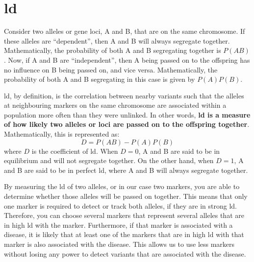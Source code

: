 \section{\glsdesc{ld}}
\label{sec:ld}

Consider two alleles or gene loci, A and B, that are on the same chromosome.
If these alleles are ``dependent'', then A and B will always segregate together.
Mathematically, the probability of both A and B segregating together is $P(AB)$.
Now, if A and B are ``independent'', then A being passed on to the offspring has no influence on B being passed on, and vice versa.
Mathematically, the probability of both A and B segregating in this case is given by $P(A)P(B)$.

\Gls{ld}, by definition, is the correlation between nearby variants such that the alleles at neighbouring markers on the same chromosome are associated within a population more often than they were unlinked.
In other words, {\bfseries \gls{ld} is a measure of how likely two alleles or loci are passed on to the offspring together}.
Mathematically, this is represented as:
\begin{equation}
	\label{eq:ld}
D = P(AB) - P(A)P(B)
\end{equation}
where $D$ is the coefficient of \gls{ld}.
When $D = 0$, A and B are said to be in equilibrium and will not segregate together.
On the other hand, when $D = 1$, A and B are said to be in perfect \gls{ld}, where A and B will always segregate together.

By measuring the \gls{ld} of two alleles, or in our case two markers, you are able to determine whether those alleles will be passed on together.
This means that only one marker is required to detect or track both alleles, if they are in strong \gls{ld}.
Therefore, you can choose several markers that represent several alleles that are in high \gls{ld} with the marker.
Furthermore, if that marker is associated with a disease, it is likely that at least one of the markers that are in high \gls{ld} with that marker is also associated with the disease.
This allows us to use less markers without losing any power to detect variants that are associated with the disease.








































